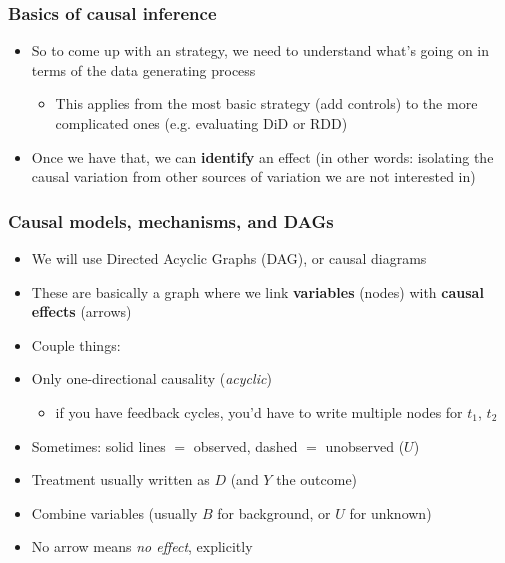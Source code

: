 \documentclass[aspectratio=43]{beamer}
\begin{document}
\begin{frame}
\frametitle{Basics of causal inference}
\centering

\begin{itemize}[<+->]
  \item So to come up with an strategy, we need to understand what's going on in terms of the data generating process
  \begin{itemize}
    \item This applies from the most basic strategy (add controls) to the more complicated ones (e.g. evaluating DiD or RDD)
  \end{itemize}
  \item Once we have that, we can \textbf{identify} an effect (in other words: isolating the causal variation from other sources of variation we are not interested in)
\end{itemize}

\end{frame}

\begin{frame}
\frametitle{Causal models, mechanisms, and DAGs}
\centering

\begin{itemize}
  \item We will use Directed Acyclic Graphs (DAG), or causal diagrams
  \item These are basically a graph where we link \textbf{variables} (nodes) with \textbf{causal effects} (arrows)
  \item[] Couple things:
  \item Only one-directional causality (\textit{acyclic})
  \begin{itemize}
    \item if you have feedback cycles, you'd have to write multiple nodes for $t_{1}$, $t_{2}$
  \end{itemize}
  \item Sometimes: solid lines $=$ observed, dashed $=$ unobserved ($U$)
  \item Treatment usually written as $D$ (and $Y$ the outcome)
  \item Combine variables (usually $B$ for background, or $U$ for unknown)
  \item No arrow means \textit{no effect}, explicitly
\end{itemize}

\end{frame}
\end{document}
